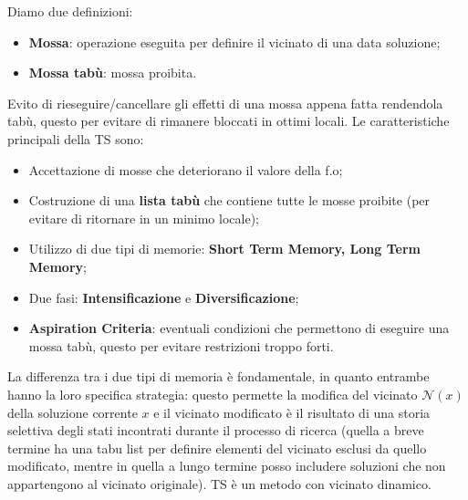 Diamo due definizioni:
\begin{itemize}
	\item \textbf{Mossa}: operazione eseguita per definire il vicinato di una data soluzione;
	\item \textbf{Mossa tabù}: mossa proibita.
\end{itemize}
Evito di rieseguire/cancellare gli effetti di una mossa appena fatta rendendola tabù, questo per evitare di rimanere bloccati in ottimi locali. Le caratteristiche principali della TS sono:
\begin{itemize}
	\item Accettazione di mosse che deteriorano il valore della f.o;
	\item Costruzione di una \textbf{lista tabù} che contiene tutte le mosse proibite (per evitare di ritornare in un minimo locale);
	\item Utilizzo di due tipi di memorie: \textbf{Short Term Memory, Long Term Memory};
	\item Due fasi: \textbf{Intensificazione} e \textbf{Diversificazione};
	\item \textbf{Aspiration Criteria}: eventuali condizioni che permettono di eseguire una mossa tabù, questo per evitare restrizioni troppo forti.
\end{itemize}
La differenza tra i due tipi di memoria è fondamentale, in quanto entrambe hanno la loro specifica strategia: questo permette la modifica del vicinato $\mathcal{N}(x)$ della soluzione corrente $x$ e il vicinato modificato è il risultato di una storia selettiva degli stati incontrati durante il processo di ricerca (quella a breve termine ha una tabu list per definire elementi del vicinato esclusi da quello modificato, mentre in quella a lungo termine posso includere soluzioni che non appartengono al vicinato originale). TS è un metodo con vicinato dinamico.

